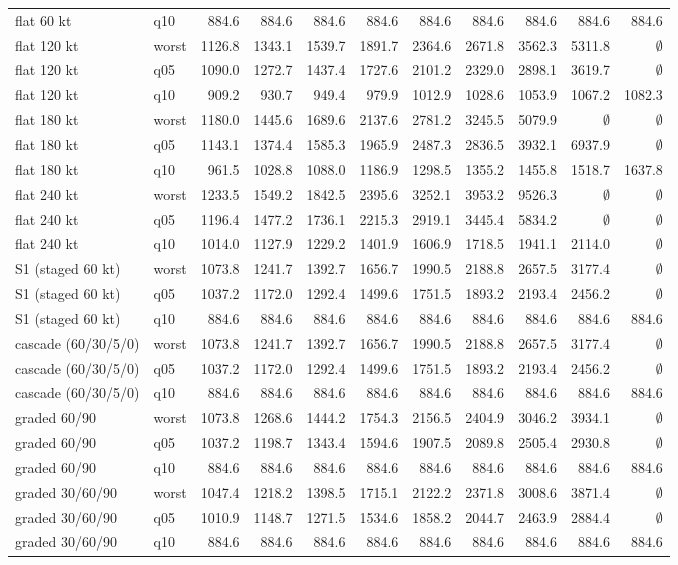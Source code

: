 \documentclass[11pt,a4paper]{article}
\begin{document}
\begin{longtable}{llrrrrrrrrr}
flat 60 kt & q10 & 884.6 & 884.6 & 884.6 & 884.6 & 884.6 & 884.6 & 884.6 & 884.6 & 884.6 \\
flat 120 kt & worst & 1126.8 & 1343.1 & 1539.7 & 1891.7 & 2364.6 & 2671.8 & 3562.3 & 5311.8 & $\emptyset$ \\
flat 120 kt & q05 & 1090.0 & 1272.7 & 1437.4 & 1727.6 & 2101.2 & 2329.0 & 2898.1 & 3619.7 & $\emptyset$ \\
flat 120 kt & q10 & 909.2 & 930.7 & 949.4 & 979.9 & 1012.9 & 1028.6 & 1053.9 & 1067.2 & 1082.3 \\
flat 180 kt & worst & 1180.0 & 1445.6 & 1689.6 & 2137.6 & 2781.2 & 3245.5 & 5079.9 & $\emptyset$ & $\emptyset$ \\
flat 180 kt & q05 & 1143.1 & 1374.4 & 1585.3 & 1965.9 & 2487.3 & 2836.5 & 3932.1 & 6937.9 & $\emptyset$ \\
flat 180 kt & q10 & 961.5 & 1028.8 & 1088.0 & 1186.9 & 1298.5 & 1355.2 & 1455.8 & 1518.7 & 1637.8 \\
flat 240 kt & worst & 1233.5 & 1549.2 & 1842.5 & 2395.6 & 3252.1 & 3953.2 & 9526.3 & $\emptyset$ & $\emptyset$ \\
flat 240 kt & q05 & 1196.4 & 1477.2 & 1736.1 & 2215.3 & 2919.1 & 3445.4 & 5834.2 & $\emptyset$ & $\emptyset$ \\
flat 240 kt & q10 & 1014.0 & 1127.9 & 1229.2 & 1401.9 & 1606.9 & 1718.5 & 1941.1 & 2114.0 & $\emptyset$ \\
S1 (staged 60 kt) & worst & 1073.8 & 1241.7 & 1392.7 & 1656.7 & 1990.5 & 2188.8 & 2657.5 & 3177.4 & $\emptyset$ \\
S1 (staged 60 kt) & q05 & 1037.2 & 1172.0 & 1292.4 & 1499.6 & 1751.5 & 1893.2 & 2193.4 & 2456.2 & $\emptyset$ \\
S1 (staged 60 kt) & q10 & 884.6 & 884.6 & 884.6 & 884.6 & 884.6 & 884.6 & 884.6 & 884.6 & 884.6 \\
cascade (60/30/5/0) & worst & 1073.8 & 1241.7 & 1392.7 & 1656.7 & 1990.5 & 2188.8 & 2657.5 & 3177.4 & $\emptyset$ \\
cascade (60/30/5/0) & q05 & 1037.2 & 1172.0 & 1292.4 & 1499.6 & 1751.5 & 1893.2 & 2193.4 & 2456.2 & $\emptyset$ \\
cascade (60/30/5/0) & q10 & 884.6 & 884.6 & 884.6 & 884.6 & 884.6 & 884.6 & 884.6 & 884.6 & 884.6 \\
graded 60/90 & worst & 1073.8 & 1268.6 & 1444.2 & 1754.3 & 2156.5 & 2404.9 & 3046.2 & 3934.1 & $\emptyset$ \\
graded 60/90 & q05 & 1037.2 & 1198.7 & 1343.4 & 1594.6 & 1907.5 & 2089.8 & 2505.4 & 2930.8 & $\emptyset$ \\
graded 60/90 & q10 & 884.6 & 884.6 & 884.6 & 884.6 & 884.6 & 884.6 & 884.6 & 884.6 & 884.6 \\
graded 30/60/90 & worst & 1047.4 & 1218.2 & 1398.5 & 1715.1 & 2122.2 & 2371.8 & 3008.6 & 3871.4 & $\emptyset$ \\
graded 30/60/90 & q05 & 1010.9 & 1148.7 & 1271.5 & 1534.6 & 1858.2 & 2044.7 & 2463.9 & 2884.4 & $\emptyset$ \\
graded 30/60/90 & q10 & 884.6 & 884.6 & 884.6 & 884.6 & 884.6 & 884.6 & 884.6 & 884.6 & 884.6 \\
\end{longtable}
\endgroup
\end{document}
